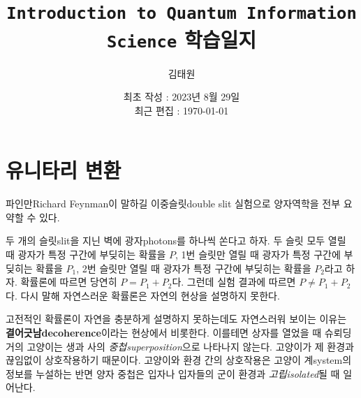 \documentclass[a4paper,chapter,atbegshi]{oblivoir}
\title{\texttt{Introduction to Quantum Information Science} 학습일지}
\author{김태원}
\date{최초 작성 : 2023년 8월 29일 \\ 최근 편집 : \today}
\begin{document}
\maketitle
\break
\tableofcontents
\chapter{유니타리 변환}
파인만{\tiny Richard Feynman}이 말하길 이중슬릿{\tiny double slit} 실험으로
양자역학을 전부 요약할 수 있다.

두 개의 슬릿{\tiny slit}을 지닌 벽에 광자{\tiny photons}를 하나씩 쏜다고 하자.
두 슬릿 모두 열릴 때 광자가 특정 구간에 부딪히는 확률을 $P$, 1번 슬릿만
열릴 때 광자가 특정 구간에 부딪히는 확률을 $P_1$, 2번 슬릿만 열릴 때 광자가
특정 구간에 부딪히는 확률을 $P_2$라고 하자. 확률론에 따르면 당연히 $P=P_1+P_2$다.
그런데 실험 결과에 따르면 $P\neq P_1+P_2$다. 다시 말해 자연스러운 확률론은 자연의 
현상을 설명하지 못한다.

고전적인 확률론이 자연을 충분하게 설명하지 못하는데도 자연스러워 보이는 이유는 
\textbf{결어긋남\tiny decoherence}이라는 현상에서 비롯한다. 이를테면 상자를
열었을 때 슈뢰딩거의 고양이는 생과 사의 \emph{중첩\tiny superposition}으로
나타나지 않는다. 고양이가 제 환경과 끊임없이 상호작용하기 때문이다. 고양이와
환경 간의 상호작용은 고양이 계{\tiny system}의 정보를 누설하는 반면 양자
중첩은 입자나 입자들의 군이 환경과 \emph{고립\tiny isolated}될 때 일어난다.
\end{document}
